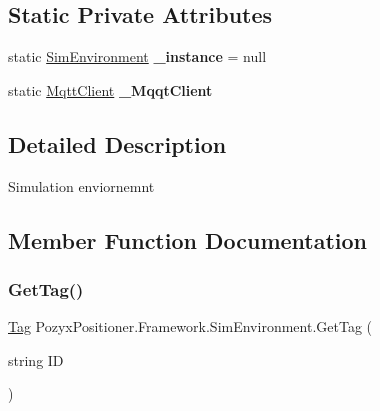 \subsection*{Static Private Attributes}
\begin{DoxyCompactItemize}
\item 
\mbox{\label{class_pozyx_positioner_1_1_framework_1_1_sim_environment_af350a1664eeb1a28757466471b9e8d38}} 
static \hyperlink{class_pozyx_positioner_1_1_framework_1_1_sim_environment}{Sim\+Environment} {\bfseries \+\_\+instance} = null
\item 
\mbox{\label{class_pozyx_positioner_1_1_framework_1_1_sim_environment_a60ce5b8b923d8f964e80c25caa6b60d7}} 
static \hyperlink{class_pozyx_positioner_1_1_framework_1_1_mqtt_client}{Mqtt\+Client} {\bfseries \+\_\+\+Mqqt\+Client}
\end{DoxyCompactItemize}


\subsection{Detailed Description}
Simulation enviornemnt 



\subsection{Member Function Documentation}
\mbox{\label{class_pozyx_positioner_1_1_framework_1_1_sim_environment_a2163b3c6c4794224ceba0e5279b7ee8e}} 
\subsubsection{\texorpdfstring{Get\+Tag()}{GetTag()}}
{\footnotesize\ttfamily \hyperlink{class_pozyx_positioner_1_1_framework_1_1_tag}{Tag} Pozyx\+Positioner.\+Framework.\+Sim\+Environment.\+Get\+Tag (\begin{DoxyParamCaption}\item[{string}]{ID }\end{DoxyParamCaption})}



